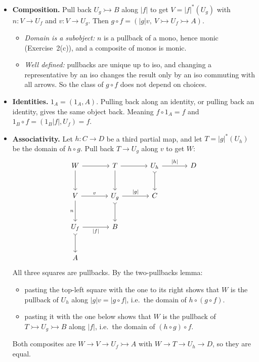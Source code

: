 \begin{itemize}
  \item \textbf{Composition.} Pull back $U_g \rightarrowtail B$ along $|f|$ to
    get $V = |f|^*(U_g)$ with $n : V \to U_f$ and $v : V \to U_g$. Then $g
    \circ f = (|g| v,\ V \rightarrowtail U_f \rightarrowtail A)$.
    \begin{itemize}
      \item \emph{Domain is a subobject:} $n$ is a pullback of a mono, hence monic
        (Exercise~2(c)), and a composite of monos is monic.
      \item \emph{Well defined:} pullbacks are unique up to iso, and changing a
        representative by an iso changes the result only by an iso commuting with
        all arrows. So the class of $g \circ f$ does not depend on choices.
    \end{itemize}
  \item \textbf{Identities.} $1_A = (1_A, A)$. Pulling back along an identity,
    or pulling back an identity, gives the same object back. Meaning $f \circ 1_A
    = f$ and $1_B \circ f = (1_B |f|, U_f) = f$.
  \item \textbf{Associativity.} Let $h : C \to D$ be a third partial map, and
    let $T = |g|^*(U_h)$ be the domain of $h \circ g$. Pull back $T \to U_g$
    along $v$ to get $W$:
    \[
      \begin{tikzcd}[sep=large]
        W \ar[r] \ar[d] & T \ar[r] \ar[d] & U_h \ar[r, "|h|"] \ar[d, tail] & D \\
        V \ar[r, "v"] \ar[d, "n"'] & U_g \ar[r, "|g|"] \ar[d, tail] & C & \\
        U_f \ar[r, "|f|"'] \ar[d, tail] & B & & \\
        A & & &
      \end{tikzcd}
    \]
    All three squares are pullbacks. By the two-pullbacks lemma:
    \begin{itemize}
      \item pasting the top-left square with the one to its right shows that
        $W$ is the pullback of $U_h$ along $|g| v = |g \circ f|$, i.e.\ the domain
        of $h \circ (g \circ f)$.
      \item pasting it with the one below shows that $W$ is the pullback of
        $T \rightarrowtail U_g \rightarrowtail B$ along $|f|$, i.e.\ the domain of
        $(h \circ g) \circ f$.
    \end{itemize}
    Both composites are $W \to V \to U_f \rightarrowtail A$ with
    $W \to T \to U_h \to D$, so they are equal.
\end{itemize}

